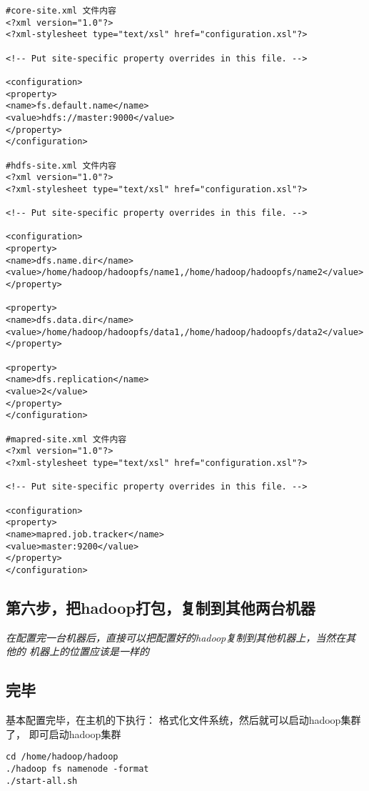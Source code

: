 \documentclass{article}
\begin{document}
\begin{verbatim}
#core-site.xml 文件内容
<?xml version="1.0"?>
<?xml-stylesheet type="text/xsl" href="configuration.xsl"?>

<!-- Put site-specific property overrides in this file. -->

<configuration>
<property>
<name>fs.default.name</name>
<value>hdfs://master:9000</value>
</property>
</configuration>

#hdfs-site.xml 文件内容
<?xml version="1.0"?>
<?xml-stylesheet type="text/xsl" href="configuration.xsl"?>

<!-- Put site-specific property overrides in this file. -->

<configuration>
<property>
<name>dfs.name.dir</name>
<value>/home/hadoop/hadoopfs/name1,/home/hadoop/hadoopfs/name2</value>
</property>

<property>
<name>dfs.data.dir</name>
<value>/home/hadoop/hadoopfs/data1,/home/hadoop/hadoopfs/data2</value>
</property>

<property>
<name>dfs.replication</name>
<value>2</value>
</property>
</configuration>

#mapred-site.xml 文件内容
<?xml version="1.0"?>
<?xml-stylesheet type="text/xsl" href="configuration.xsl"?>

<!-- Put site-specific property overrides in this file. -->

<configuration>
<property>
<name>mapred.job.tracker</name>
<value>master:9200</value>
</property>
</configuration>
\end{verbatim}

\subsection{第六步，把hadoop打包，复制到其他两台机器}
\textit{在配置完一台机器后，直接可以把配置好的hadoop复制到其他机器上，当然在其他的
机器上的位置应该是一样的}

\subsection{完毕}
基本配置完毕，在主机的下执行：
 格式化文件系统，然后就可以启动hadoop集群了，
即可启动hadoop集群

\begin{verbatim}
cd /home/hadoop/hadoop
./hadoop fs namenode -format
./start-all.sh
\end{verbatim}
\end{document}
